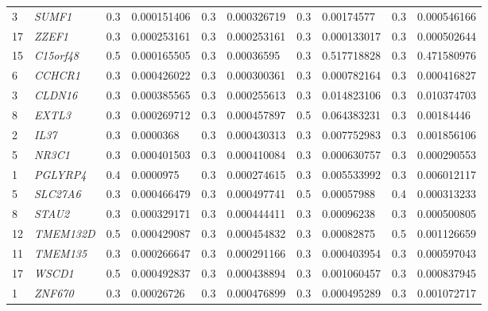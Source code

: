 \begin{refsection}
\begin{otherlanguage}{english}
\begin{scriptsize}
\begin{longtable}{llllllllll}
3 & \cellcolor[HTML]{CBCEFB}\textit{SUMF1} & 0.3 & 0.000151406 & 0.3 & 0.000326719 & 0.3 & 0.00174577 & 0.3 & 0.000546166 \\
17 & \cellcolor[HTML]{CBCEFB}\textit{ZZEF1} & 0.3 & 0.000253161 & 0.3 & 0.000253161 & 0.3 & \cellcolor[HTML]{CBCEFB}0.000133017 & 0.3 & 0.000502644 \\
15 & \cellcolor[HTML]{CBCEFB}\textit{C15orf48} & 0.5 & 0.000165505 & 0.3 & 0.00036595 & 0.3 & 0.517718828 & 0.3 & 0.471580976 \\
6 & \cellcolor[HTML]{CBCEFB}\textit{CCHCR1} & 0.3 & 0.000426022 & 0.3 & 0.000300361 & 0.3 & 0.000782164 & 0.3 & \cellcolor[HTML]{CBCEFB}0.000416827 \\
3 & \cellcolor[HTML]{CBCEFB}\textit{CLDN16} & 0.3 & 0.000385565 & 0.3 & 0.000255613 & 0.3 & 0.014823106 & 0.3 & 0.010374703 \\
8 & \cellcolor[HTML]{CBCEFB}\textit{EXTL3} & 0.3 & 0.000269712 & 0.3 & 0.000457897 & 0.5 & 0.064383231 & 0.3 & 0.00184446 \\
2 & \cellcolor[HTML]{CBCEFB}\textit{IL37} & 0.3 & 0.0000368 & 0.3 & 0.000430313 & 0.3 & 0.007752983 & 0.3 & 0.001856106 \\
5 & \cellcolor[HTML]{CBCEFB}\textit{NR3C1} & 0.3 & 0.000401503 & 0.3 & 0.000410084 & 0.3 & 0.000630757 & 0.3 & \cellcolor[HTML]{CBCEFB}0.000290553 \\
1 & \cellcolor[HTML]{CBCEFB}\textit{PGLYRP4} & 0.4 & 0.0000975 & 0.3 & 0.000274615 & 0.3 & 0.005533992 & 0.3 & 0.006012117 \\
5 & \cellcolor[HTML]{CBCEFB}\textit{SLC27A6} & 0.3 & 0.000466479 & 0.3 & 0.000497741 & 0.5 & 0.00057988 & 0.4 & \cellcolor[HTML]{CBCEFB}0.000313233 \\
8 & \cellcolor[HTML]{CBCEFB}\textit{STAU2} & 0.3 & 0.000329171 & 0.3 & 0.000444411 & 0.3 & 0.00096238 & 0.3 & 0.000500805 \\
12 & \cellcolor[HTML]{CBCEFB}\textit{TMEM132D} & 0.5 & 0.000429087 & 0.3 & 0.000454832 & 0.3 & 0.00082875 & 0.5 & 0.001126659 \\
11 & \cellcolor[HTML]{CBCEFB}\textit{TMEM135} & 0.3 & 0.000266647 & 0.3 & 0.000291166 & 0.3 & \cellcolor[HTML]{CBCEFB}0.000403954 & 0.3 & 0.000597043 \\
17 & \cellcolor[HTML]{CBCEFB}\textit{WSCD1} & 0.5 & 0.000492837 & 0.3 & 0.000438894 & 0.3 & 0.001060457 & 0.3 & 0.000837945 \\
1 & \cellcolor[HTML]{CBCEFB}\textit{ZNF670} & 0.3 & 0.00026726 & 0.3 & 0.000476899 & 0.3 & \cellcolor[HTML]{CBCEFB}0.000495289 & 0.3 & 0.001072717 \\

\end{longtable}
\end{scriptsize}
\end{otherlanguage}
\end{refsection}
